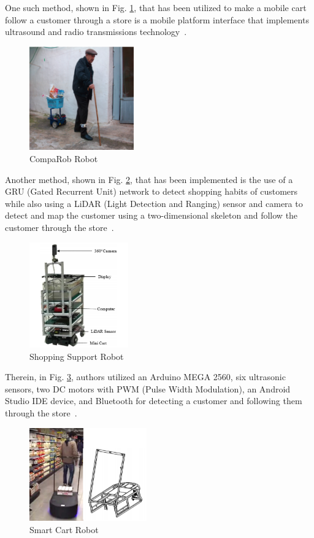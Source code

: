 \vspace*{12pt}
\noindent
One such method, shown in Fig. \ref{fig:CompaRob}, that has been utilized to make a mobile cart follow a customer through a store is a mobile platform interface that implements ultrasound and radio transmissions technology~\cite{Sales2016-CompaRob}.
\begin{figure}[H]
   \centering
   \includegraphics[width=0.4\textwidth]{figs/img/CompaRob}
   \caption{CompaRob Robot}
   \label{fig:CompaRob}
\end{figure}
Another method, shown in Fig. \ref{fig:ShoppingSup}, that has been implemented is the use of a GRU (Gated Recurrent Unit) network to detect shopping habits of customers while also using a LiDAR (Light Detection and Ranging) sensor and camera to detect and map the customer using a two-dimensional skeleton and follow the customer through the store~\cite{islam_lam_fukuda_kobayashi_kuno_2019}.
\begin{figure}[H]
   \centering
   \includegraphics[width=0.38\textwidth]{figs/img/ShoppingSuportRobot}
   \caption{Shopping Support Robot}
   \label{fig:ShoppingSup}
\end{figure}
Therein, in Fig. \ref{fig:SmartCart}, authors utilized an Arduino MEGA 2560, six ultrasonic sensors, two DC motors with PWM (Pulse Width Modulation), an Android Studio IDE device, and Bluetooth for detecting a customer and following them through the store~\cite{Rawashdeh2017-Person}.
\begin{figure}[H]
   \centering
   \includegraphics[width=0.45\textwidth]{figs/img/SmartCart}
   \caption{Smart Cart Robot}
   \label{fig:SmartCart}
\end{figure}

